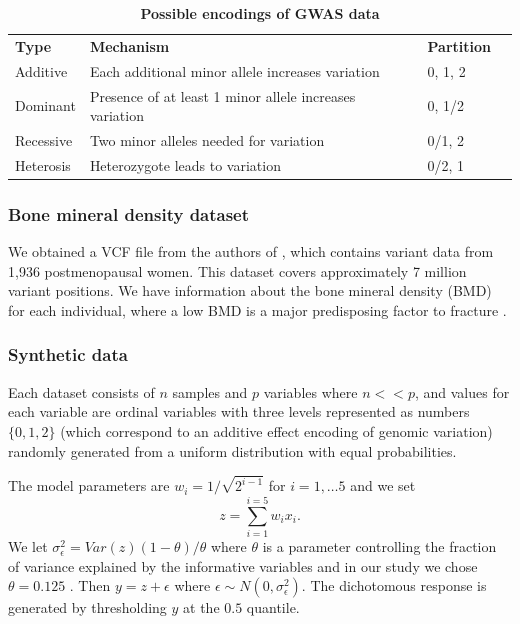 \documentclass[10pt,letterpaper]{article}
\newlength\savedwidth
\newcommand\thickhline{\noalign{\global\savedwidth\arrayrulewidth\global\arrayrulewidth 2pt}%
\hline
\noalign{\global\arrayrulewidth\savedwidth}}
\begin{document}
\begin{table}[!ht]
\begin{flushleft} 
\centering
\caption{\bf Possible encodings of GWAS data \cite{Goldstein.et.al.2011}}
\begin{tabular}{|l|l|l|l||}
\hline
{\bf Type} & {\bf Mechanism}                                         & {\bf Partition} \\ 
\thickhline
Additive   & Each additional minor allele increases variation        & 0, 1, 2         \\
Dominant   & Presence of at least 1 minor allele increases variation & 0, 1/2          \\
Recessive  & Two minor alleles needed for variation                  & 0/1, 2          \\
Heterosis  & Heterozygote leads to variation                         & 0/2, 1          \\ \hline
\end{tabular}
\label{table:encodings}
\end{flushleft}
\end{table}


\subsubsection{Bone mineral density dataset}
We obtained a VCF file from the authors of \cite{Duncan.2011}, which contains variant data from 1,936 postmenopausal women.
This dataset covers approximately 7 million variant positions. We have information about the bone mineral density (BMD)
for each individual, where a low BMD is a major predisposing factor to fracture \cite{Duncan.2011}. 

\subsubsection{Synthetic data} 
\label{section:synthetic_data}
 Each dataset consists of $n$ samples and $p$ variables where $n << p$,
and values for each variable are ordinal variables with three levels represented as numbers $\{0, 1, 2\}$ (which
correspond to an additive effect encoding of genomic variation) randomly generated from a uniform distribution with equal
probabilities.  

The model parameters are $w_i = 1/\sqrt{2^{i-1}}$ for $i =1,\ldots 5$ and we set 
\begin{equation}
\label{equation:synthetic.data}
z =  \sum_{i=1}^{i=5} {w_i x_i}.
\end{equation}
We let $\sigma_\epsilon^2 = Var(z)(1-\theta)/\theta $  where $\theta$ is a parameter controlling the fraction of variance explained by the informative variables and in our study we chose $\theta = 0.125$ . Then 
$y =   z + \epsilon$ where $\epsilon \sim  N(0, \sigma_\epsilon^2).$
The dichotomous response is generated by thresholding $y$ at the $0.5$ quantile.
\end{document}
